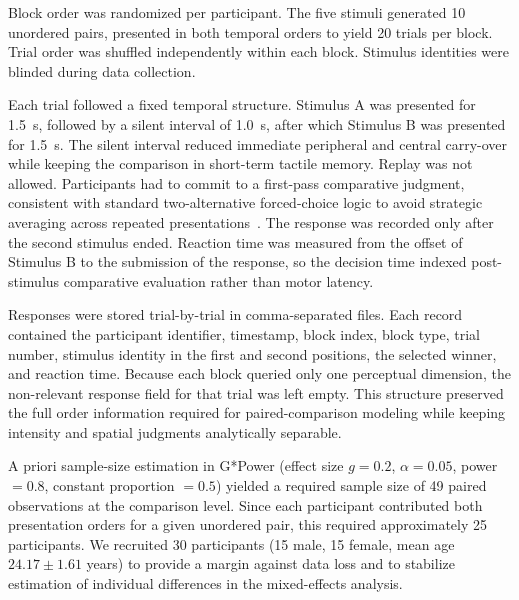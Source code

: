 \documentclass[pdflatex, sn-nature]{sn-jnl}
\theoremstyle{thmstyleone}%
\theoremstyle{thmstyletwo}%
\theoremstyle{thmstylethree}%
\begin{document}
Block order was randomized per participant. The five stimuli generated 10 unordered pairs, presented in both temporal orders to yield 20 trials per block. Trial order was shuffled independently within each block. Stimulus identities were blinded during data collection.

Each trial followed a fixed temporal structure. Stimulus A was presented for \qty{1.5}{\second}, followed by a silent interval of \qty{1.0}{\second}, after which Stimulus B was presented for \qty{1.5}{\second}. The silent interval reduced immediate peripheral and central carry-over while keeping the comparison in short-term tactile memory. Replay was not allowed. Participants had to commit to a first-pass comparative judgment, consistent with standard two-alternative forced-choice logic to avoid strategic averaging across repeated presentations~\citep{bradleyRankAnalysisIncomplete1952}. The response was recorded only after the second stimulus ended. Reaction time was measured from the offset of Stimulus B to the submission of the response, so the decision time indexed post-stimulus comparative evaluation rather than motor latency.

Responses were stored trial-by-trial in comma-separated files. Each record contained the participant identifier, timestamp, block index, block type, trial number, stimulus identity in the first and second positions, the selected winner, and reaction time. Because each block queried only one perceptual dimension, the non-relevant response field for that trial was left empty. This structure preserved the full order information required for paired-comparison modeling while keeping intensity and spatial judgments analytically separable.

A priori sample-size estimation in G*Power (effect size $g=0.2$, $\alpha=0.05$, power $=0.8$, constant proportion $=0.5$) yielded a required sample size of 49 paired observations at the comparison level. Since each participant contributed both presentation orders for a given unordered pair, this required approximately 25 participants. We recruited 30 participants (15 male, 15 female, mean age $24.17 \pm 1.61$ years) to provide a margin against data loss and to stabilize estimation of individual differences in the mixed-effects analysis.
\end{document}
